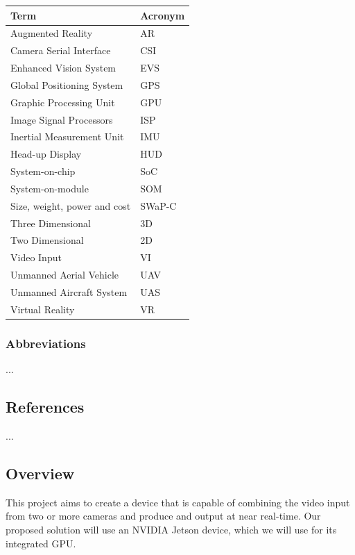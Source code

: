 \documentclass[letterpaper,10pt,serif,draftclsnofoot,onecolumn,compsoc,titlepage]{IEEEtran}
\begin{document}
\begin{tabular}{|l|l|}
\hline
\textbf{Term} & \textbf{Acronym}\\
\hline
Augmented Reality & AR\\
\hline
Camera Serial Interface & CSI\\
\hline
Enhanced Vision System & EVS\\
\hline
Global Positioning System & GPS\\
\hline
Graphic Processing Unit & GPU\\
\hline
Image Signal Processors & ISP\\
\hline
Inertial Measurement Unit & IMU\\
\hline
Head-up Display & HUD\\
\hline
System-on-chip & SoC\\
\hline
System-on-module & SOM\\
\hline
Size, weight, power and cost & SWaP-C\\
\hline
Three Dimensional & 3D\\
\hline
Two Dimensional & 2D\\
\hline
Video Input & VI\\
\hline
Unmanned Aerial Vehicle & UAV\\
\hline
Unmanned Aircraft System & UAS\\
\hline
Virtual Reality & VR\\
\hline
\end{tabular}

\subsubsection{Abbreviations}

...

\subsection{References}

...

\subsection{Overview}

This project aims to create a device that is capable of combining the video input from 
two or more cameras and produce and output at near real-time. Our proposed solution 
will use an NVIDIA Jetson device, which we will use for its integrated GPU.\\
\end{document}
